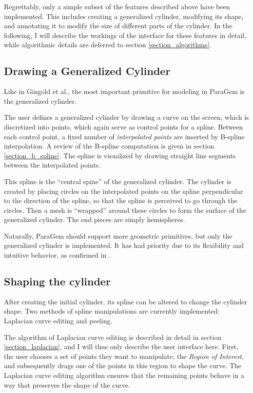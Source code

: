 \documentclass[english]{article}
\begin{document}
Regrettably, only a simple subset of the features described above have been implemented. This includes creating a generalized cylinder, modifying its shape, and annotating it to modify the size of different parts of the cylinder. In the following, I will describe the workings of the interface for these features in detail, while algorithmic details are deferred to section \ref{section_algorithms}.

\subsection{Drawing a Generalized Cylinder}

Like in Gingold et al., the most important primitive for modeling in ParaGem is the generalized cylinder. 

The user defines a generalized cylinder by drawing a curve on the screen, which is discretized into points, which again serve as control points for a spline. Between each control point, a fixed number of \textit{interpolated points} are inserted by B-spline interpolation. A review of the B-spline computation is given in section \ref{section_b_spline}. The spline is visualized by drawing straight line segments between the interpolated points.

This spline is the ``central spine'' of the generalized cylinder. The cylinder is created by placing circles on the interpolated points on the spline perpendicular to the direction of the spline, so that the spline is perceived to go through the circles. Then a mesh is ``wrapped'' around these circles to form the surface of the generalized cylinder. The end pieces are simply hemispheres.

Naturally, ParaGem should support more geometric primitives, but only the generalized cylinder is implemented. It has had priority due to its flexibility and intuitive behavior, as confirmed in \cite{gingold09}.

\subsection{Shaping the cylinder}


After creating the initial cylinder, its spline can be altered to change the cylinder shape. Two methods of spline manipulations are currently implemented: Laplacian curve editing and peeling.

The algorithm of Laplacian curve editing is described in detail in section \ref{section_laplacian}, and I will thus only describe the user interface here. First, the user chooses a set of points they want to manipulate; the \textit{Region of Interest}, and subsequently drags one of the points in this region to shape the curve. The Laplacian curve editing algorithm ensures that the remaining points behave in a way that preserves the shape of the curve.
\end{document}
